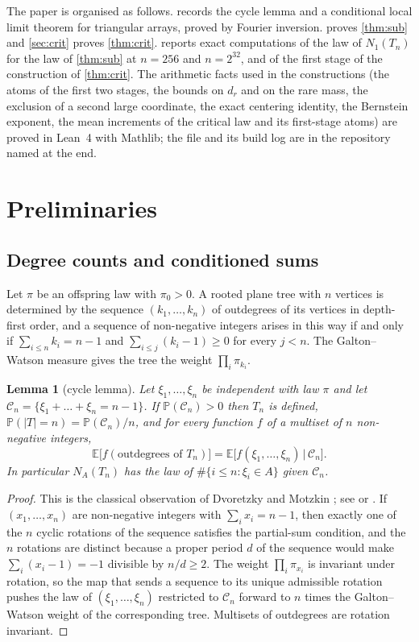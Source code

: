 \documentclass[11pt]{amsart}
\newtheorem{lemma}[theorem]{Lemma}
\theoremstyle{definition}
\newcommand{\E}{\mathbb{E}}
\newcommand{\Prob}{\mathbb{P}}
\newcommand{\Cond}{\mathcal{C}}
\begin{document}
The paper is organised as follows.  records the cycle lemma and a conditional local limit theorem for triangular arrays, proved by Fourier inversion.  proves \cref{thm:sub} and \cref{sec:crit} proves \cref{thm:crit}.  reports exact computations of the law of $N_1(T_n)$ for the law of \cref{thm:sub} at $n=256$ and $n=2^{32}$, and of the first stage of the construction of \cref{thm:crit}. The arithmetic facts used in the constructions (the atoms of the first two stages, the bounds on $d_r$ and on the rare mass, the exclusion of a second large coordinate, the exact centering identity, the Bernstein exponent, the mean increments of the critical law and its first-stage atoms) are proved in Lean~4 with Mathlib; the file and its build log are in the repository named at the end.

\section{Preliminaries}\label{sec:prelim}

\subsection{Degree counts and conditioned sums}

Let $\pi$ be an offspring law with $\pi_0>0$. A rooted plane tree with $n$ vertices is determined by the sequence $(k_1,\dots,k_n)$ of outdegrees of its vertices in depth-first order, and a sequence of non-negative integers arises in this way if and only if $\sum_{i\le n}k_i=n-1$ and $\sum_{i\le j}(k_i-1)\ge0$ for every $j<n$. The Galton--Watson measure gives the tree the weight $\prod_i\pi_{k_i}$.

\begin{lemma}[cycle lemma]\label{lem:cycle}
Let $\xi_1,\dots,\xi_n$ be independent with law $\pi$ and let $\Cond_n=\{\xi_1+\dots+\xi_n=n-1\}$. If $\Prob(\Cond_n)>0$ then $T_n$ is defined, $\Prob(|T|=n)=\Prob(\Cond_n)/n$, and for every function $f$ of a multiset of $n$ non-negative integers,
\[
\E\big[f(\text{outdegrees of }T_n)\big]=\E\big[f(\xi_1,\dots,\xi_n)\,\big|\,\Cond_n\big].
\]
In particular $N_A(T_n)$ has the law of $\#\{i\le n:\xi_i\in A\}$ given $\Cond_n$.
\end{lemma}

\begin{proof}
This is the classical observation of Dvoretzky and Motzkin \cite{DM}; see \cite[Section 15]{Janson12} or \cite[Section 6.1]{Pitman}. If $(x_1,\dots,x_n)$ are non-negative integers with $\sum_i x_i=n-1$, then exactly one of the $n$ cyclic rotations of the sequence satisfies the partial-sum condition, and the $n$ rotations are distinct because a proper period $d$ of the sequence would make $\sum_i(x_i-1)=-1$ divisible by $n/d\ge2$. The weight $\prod_i\pi_{x_i}$ is invariant under rotation, so the map that sends a sequence to its unique admissible rotation pushes the law of $(\xi_1,\dots,\xi_n)$ restricted to $\Cond_n$ forward to $n$ times the Galton--Watson weight of the corresponding tree. Multisets of outdegrees are rotation invariant.
\end{proof}
\end{document}
